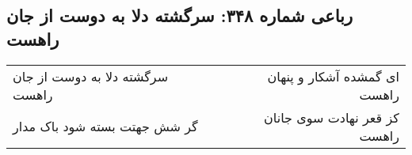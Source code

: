 \begin{center}
\section*{رباعی شماره ۳۴۸: سرگشته دلا به دوست از جان راهست}
\label{sec:0348}
\begin{longtable}{l p{0.5cm} r}
سرگشته دلا به دوست از جان راهست
&&
ای گمشده آشکار و پنهان راهست
\\
گر شش جهتت بسته شود باک مدار
&&
کز قعر نهادت سوی جانان راهست
\\
\end{longtable}
\end{center}
